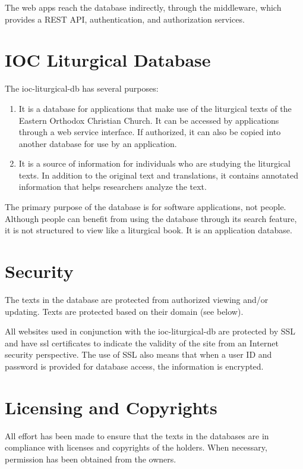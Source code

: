 \documentclass[]{memoir}
\def\iocLDb{ioc-liturgical-db }%
\begin{document}
The web apps reach the database indirectly, through the middleware, which provides a REST API, authentication, and authorization services.  

\section{IOC Liturgical Database}
The ioc-liturgical-db has several purposes:

\begin{enumerate}
    \item It is a database for applications that make use of the liturgical texts of the Eastern Orthodox Christian Church. It can be accessed by applications through a web service interface.  If authorized, it can also be copied into another database for use by an application.
    \item It is a source of information for individuals who are studying the liturgical texts.  In addition to the original text and translations, it contains annotated information that helps researchers analyze the text.
\end{enumerate}

\begin{boxed}
The primary purpose of the database is for software applications, not people.  Although people can benefit from using the database through its search feature, it is not structured to view like a liturgical book.  It is an application database.
\end{boxed}

\section{Security}

The texts in the database are protected from authorized viewing and/or updating.  Texts are protected based on their domain (see below).

All websites used in conjunction with the \iocLDb are protected by SSL and have ssl certificates to indicate the validity of the site from an Internet security perspective.  The use of SSL also means that when a user ID and password is provided for database access, the information is encrypted.

\section{Licensing and Copyrights}

All effort has been made to ensure that the texts in the databases are in compliance with licenses and copyrights of the holders.  When necessary, permission has been obtained from the owners.
\end{document}
